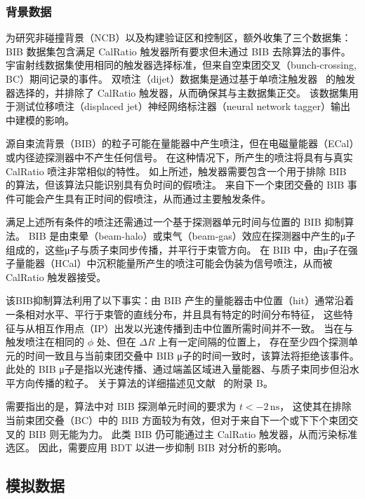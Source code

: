 \subsubsection{背景数据}
为研究非碰撞背景（NCB）以及构建验证区和控制区，额外收集了三个数据集：
BIB 数据集包含满足 CalRatio 触发器所有要求但未通过 BIB 去除算法的事件。
宇宙射线数据集使用相同的触发器选择标准，但来自空束团交叉（bunch-crossing, BC）期间记录的事件。
双喷注（dijet）数据集是通过基于单喷注触发器~\cite{trigger} 的触发器选择的，并排除了 CalRatio 触发器，从而确保其与主数据集正交。
该数据集用于测试位移喷注（displaced jet）神经网络标注器（neural network tagger）输出中建模的影响。

源自束流背景（BIB）的粒子可能在量能器中产生喷注，但在电磁量能器（ECal）或内径迹探测器中不产生任何信号。
在这种情况下，所产生的喷注将具有与真实 CalRatio 喷注非常相似的特性。
如上所述，触发器需要包含一个用于排除 BIB 的算法，但该算法只能识别具有负时间的假喷注。
来自下一个束团交叠的 BIB 事件可能会产生具有正时间的假喷注，从而通过主要触发条件。

满足上述所有条件的喷注还需通过一个基于探测器单元时间与位置的 BIB 抑制算法。
BIB 是由束晕（beam-halo）或束气（beam-gas）效应在探测器中产生的μ子组成的，这些μ子与质子束同步传播，并平行于束管方向。
在 BIB 中，由μ子在强子量能器（HCal）中沉积能量所产生的喷注可能会伪装为信号喷注，从而被 CalRatio 触发器接受。

该BIB抑制算法利用了以下事实：由 BIB 产生的量能器击中位置（hit）通常沿着一条相对水平、平行于束管的直线分布，并且具有特定的时间分布特征，
这些特征与从相互作用点（IP）出发以光速传播到击中位置所需时间并不一致。
当在与触发喷注在相同的 $\phi$ 处、但在 $\Delta R$ 上有一定间隔的位置上，
存在至少四个探测单元的时间一致且与当前束团交叠中 BIB μ子的时间一致时，该算法将拒绝该事件。
此处的 BIB μ子是指以光速传播、通过端盖区域进入量能器、与质子束同步但沿水平方向传播的粒子。
关于算法的详细描述见文献~\cite{ATLAS-CONF-2016-103} 的附录 B。

需要指出的是，算法中对 BIB 探测单元时间的要求为 $t < -2\,\mathrm{ns}$，
这使其在排除当前束团交叠（BC）中的 BIB 方面较为有效，但对于来自下一个或下下个束团交叉的 BIB 则无能为力。
此类 BIB 仍可能通过主 CalRatio 触发器，从而污染标准选区。
因此，需要应用 BDT 以进一步抑制 BIB 对分析的影响。


\subsection{模拟数据}
\label{sec:MC}

